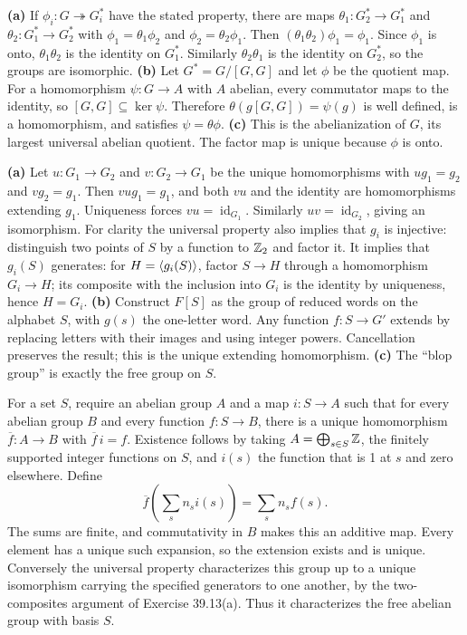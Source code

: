 \textbf{(a)} If $\phi_i:G\twoheadrightarrow G_i^*$ have the stated property, there are maps $\theta_1:G_2^*\to G_1^*$ and $\theta_2:G_1^*\to G_2^*$ with $\phi_1=\theta_1\phi_2$ and $\phi_2=\theta_2\phi_1$.
Then $(\theta_1\theta_2)\phi_1=\phi_1$. Since $\phi_1$ is onto, $\theta_1\theta_2$ is the identity on $G_1^*$. Similarly $\theta_2\theta_1$ is the identity on $G_2^*$, so the groups are isomorphic.
\textbf{(b)} Let $G^*=G/[G,G]$ and let $\phi$ be the quotient map. For a homomorphism $\psi:G\to A$ with $A$ abelian, every commutator maps to the identity, so $[G,G]\subseteq\ker\psi$. Therefore $\theta(g[G,G])=\psi(g)$ is well defined, is a homomorphism, and satisfies $\psi=\theta\phi$.
\textbf{(c)} This is the abelianization of $G$, its largest universal abelian quotient. The factor map is unique because $\phi$ is onto.

\textbf{(a)} Let $u:G_1\to G_2$ and $v:G_2\to G_1$ be the unique homomorphisms with $ug_1=g_2$ and $vg_2=g_1$. Then $vug_1=g_1$, and both $vu$ and the identity are homomorphisms extending $g_1$. Uniqueness forces $vu=\operatorname{id}_{G_1}$. Similarly $uv=\operatorname{id}_{G_2}$, giving an isomorphism.
For clarity the universal property also implies that $g_i$ is injective: distinguish two points of $S$ by a function to $\mathbb{Z}_2$ and factor it. It implies that $g_i(S)$ generates: for $H=\langle g_i(S)\rangle$, factor $S\to H$ through a homomorphism $G_i\to H$; its composite with the inclusion into $G_i$ is the identity by uniqueness, hence $H=G_i$.
\textbf{(b)} Construct $F[S]$ as the group of reduced words on the alphabet $S$, with $g(s)$ the one-letter word. Any function $f:S\to G'$ extends by replacing letters with their images and using integer powers. Cancellation preserves the result; this is the unique extending homomorphism.
\textbf{(c)} The ``blop group'' is exactly the free group on $S$.

For a set $S$, require an abelian group $A$ and a map $i:S\to A$ such that for every abelian group $B$ and every function $f:S\to B$, there is a unique homomorphism $\overline f:A\to B$ with $\overline f\,i=f$.
Existence follows by taking $A=\bigoplus_{s\in S}\mathbb{Z}$, the finitely supported integer functions on $S$, and $i(s)$ the function that is 1 at $s$ and zero elsewhere. Define
\[
\overline f\left(\sum_s n_si(s)\right)=\sum_s n_sf(s).
\]
The sums are finite, and commutativity in $B$ makes this an additive map. Every element has a unique such expansion, so the extension exists and is unique. Conversely the universal property characterizes this group up to a unique isomorphism carrying the specified generators to one another, by the two-composites argument of Exercise 39.13(a). Thus it characterizes the free abelian group with basis $S$.
